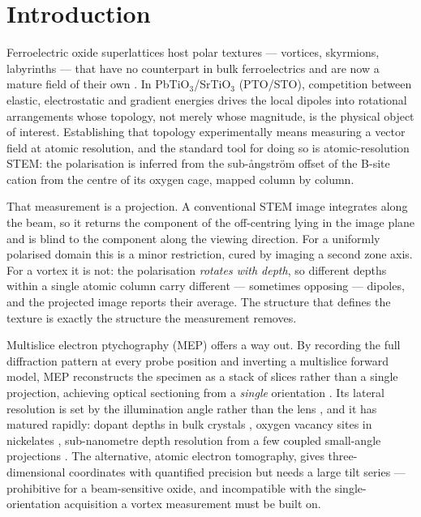\documentclass[aps,prb,twocolumn,superscriptaddress,floatfix,nofootinbib]{revtex4-2}
\begin{document}
\maketitle

\section{Introduction}

Ferroelectric oxide superlattices host polar textures --- vortices, skyrmions, labyrinths ---
that have no counterpart in bulk ferroelectrics and are now a mature field of their own
\citep{Yadav2016,Tang2015,Das2019,Junquera2023}. In PbTiO$_3$/SrTiO$_3$ (PTO/STO), competition
between elastic, electrostatic and gradient energies drives the local dipoles into
rotational arrangements whose topology, not merely whose magnitude, is the physical object of
interest. Establishing that topology experimentally means measuring a vector field at atomic
resolution, and the standard tool for doing so is atomic-resolution STEM: the polarisation is
inferred from the sub-\aa{}ngstr\"om offset of the B-site cation from the centre of its oxygen
cage, mapped column by column.

That measurement is a projection. A conventional STEM image integrates along the beam, so it
returns the component of the off-centring lying in the image plane and is blind to the
component along the viewing direction. For a uniformly polarised domain this is a minor
restriction, cured by imaging a second zone axis. For a vortex it is not: the polarisation
\emph{rotates with depth}, so different depths within a single atomic column carry different
--- sometimes opposing --- dipoles, and the projected image reports their average. The
structure that defines the texture is exactly the structure the measurement removes.

Multislice electron ptychography (MEP) offers a way out. By recording the full diffraction
pattern at every probe position and inverting a multislice forward model, MEP reconstructs the
specimen as a stack of slices rather than a single projection, achieving optical sectioning
from a \emph{single} orientation \citep{Gao2017,Chen2021,MaidenHumphryRodenburg2012}. Its
lateral resolution is set by the illumination angle rather than the lens
\citep{Nellist1995,Jiang2018,Nguyen2024}, and it has matured rapidly: dopant depths in bulk
crystals \citep{Chen2021}, oxygen vacancy sites in nickelates \citep{Dong2024}, sub-nanometre
depth resolution from a few coupled small-angle projections \citep{Dong2025}. The alternative,
atomic electron tomography, gives three-dimensional coordinates with quantified precision
\citep{Yang2017,Yang2021,Xu2015} but needs a large tilt series --- prohibitive for a
beam-sensitive oxide, and incompatible with the single-orientation acquisition a vortex
measurement must be built on.
\end{document}
